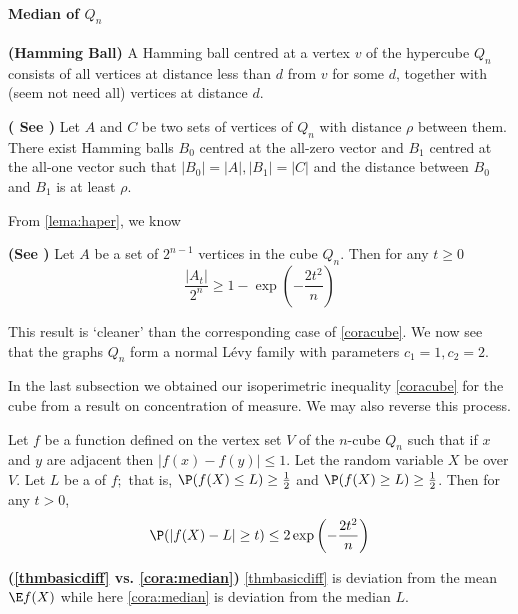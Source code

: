 \documentclass{article}
\newcommand{\bfs}[1]{\textbf{({#1})}}
\begin{document}
\paragraph{Median of $Q_n$}
\begin{defa}{\bfs{Hamming Ball}}
A Hamming ball centred at a vertex $v$ of the hypercube $Q _{ n }$ consists of all vertices at distance less than $d$ from $v$ for some $d$, together with  (seem not need all) vertices at distance $d$.
\end{defa}

\begin{lema}{\bfs{ See \cite{harper1966optimal}}}\label{lema:haper}
Let $A$ and $C$ be two sets of vertices of $Q _{ n }$ with distance $\rho$ between them. There exist Hamming balls $B_{0}$ centred at the all-zero vector and $B _{1}$ centred at the all-one vector such that $\left| B _{0}\right|=| A |,\left| B _{1}\right|=| C |$ and the
distance between $B_{0}$ and $B_{1}$ is at least $\rho .$
\end{lema}
From \cref{lema:haper}, we know
\begin{lema}{\bfs{See \cite{amir1980unconditional}}}\label{lema:sc}
Let $A$ be a set of $2^{ n -1}$ vertices in the cube $Q _{ n }$. Then for any $t \geq 0$ $$ \frac{\left|A_{t}\right| }{ 2^{n}} \geq 1-\exp \left(-\frac{2 t^{2}}{ n}\right)
$$
\end{lema}
\begin{rema}
This result is `cleaner' than the corresponding case of \cref{coracube}. We now
see that the graphs $Q _{ n }$ form a normal L\'{e}vy family with parameters $c _{1}=1, c _{2}=2$. 
\end{rema}
In the last subsection we obtained our isoperimetric inequality  \cref{coracube} for
the cube from a result on concentration of measure. We may also reverse this
process.
\begin{cora}\label{cora:median}
 Let $f$ be a function defined on the vertex set $V$ of the $n$-cube
$Q _{ n }$ such that if $x$ and $y$ are adjacent then $| f ( x )- f ( y )| \leq 1 .$ Let the random
variable $X$ be  over $V$. Let $L$ be a  of $f ;$ that is, $\P ( f ( X )\leq L ) \geq \frac{1}{2}$ and $\P ( f ( X ) \geq L ) \geq \frac{1}{2}$. Then for any $t >0$,
$$
\P (| f ( X )- L | \geq t) \leq 2 \exp \left(-\frac{2 t ^{2} }{ n} \right)
$$
\end{cora} 
\begin{rema}{\bfs{\cref{thmbasicdiff} vs. \cref{cora:median}}}
\cref{thmbasicdiff} is deviation from the mean $\E f(X)$ while here  \cref{cora:median} is deviation from the median $L$. 
\end{rema}
\end{document}
